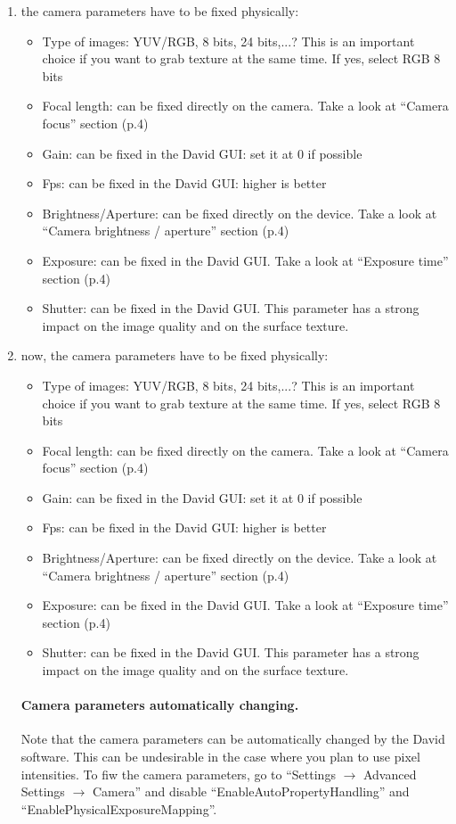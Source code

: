 \documentclass[11pt]{article}
\begin{document}
\begin{enumerate}
\item the camera parameters have to be fixed physically:
\begin{itemize}
\item Type of images: YUV/RGB, 8 bits, 24 bits,...? This is an important choice if you want to grab texture at the same time. If yes, select RGB 8 bits
\item Focal length: can be fixed directly on the camera. Take a look at ``Camera focus'' section (p.4)
\item Gain: can be fixed in the David GUI: set it at 0 if possible
\item Fps: can be fixed in the David GUI: higher is better
\item Brightness/Aperture: can be fixed directly on the device. Take a look at ``Camera brightness / aperture'' section (p.4)
\item Exposure: can be fixed in the David GUI. Take a look at ``Exposure time'' section (p.4)
\item Shutter: can be fixed in the David GUI. This parameter has a strong impact on the image quality and on the surface texture.
\end{itemize}
\item now, the camera parameters have to be fixed physically:
\begin{itemize}
\item Type of images: YUV/RGB, 8 bits, 24 bits,...? This is an important choice if you want to grab texture at the same time. If yes, select RGB 8 bits
\item Focal length: can be fixed directly on the camera. Take a look at ``Camera focus'' section (p.4)
\item Gain: can be fixed in the David GUI: set it at 0 if possible
\item Fps: can be fixed in the David GUI: higher is better
\item Brightness/Aperture: can be fixed directly on the device. Take a look at ``Camera brightness / aperture'' section (p.4)
\item Exposure: can be fixed in the David GUI. Take a look at ``Exposure time'' section (p.4)
\item Shutter: can be fixed in the David GUI. This parameter has a strong impact on the image quality and on the surface texture.
\end{itemize}

\paragraph{Camera parameters automatically changing.}
Note that the camera parameters can be automatically changed by the David software.
This can be undesirable in the case where you plan to use pixel intensities.
To fiw the camera parameters, go to ``Settings $\rightarrow$ Advanced Settings $\rightarrow$ Camera'' and disable ``EnableAutoPropertyHandling'' and ``EnablePhysicalExposureMapping''.


\end{enumerate}
\end{document}
